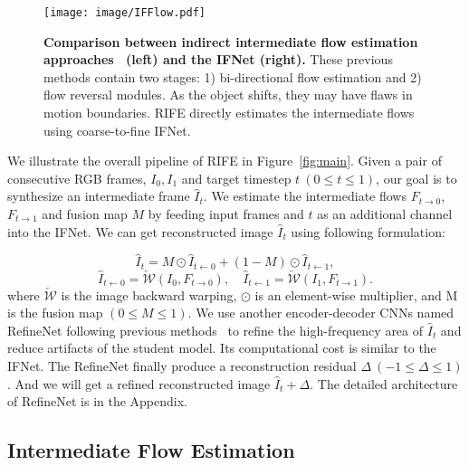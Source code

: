 \documentclass[final]{cvpr}
\newcommand{\backwardwarp}{\overleftarrow{\mathcal{W}}}
\begin{document}
\begin{figure}[t]
	\centering
	\texttt{[image: image/IFFlow.pdf]}
	\caption{\textbf{Comparison between indirect intermediate flow estimation approaches~\cite{jiang2018super, xu2019quadratic, bao2019depth, liu2020enhanced} (left) and the IFNet (right).} These previous methods contain two stages: 1) bi-directional flow estimation and 2) flow reversal modules. As the object shifts, they may have flaws in motion boundaries. RIFE directly estimates the intermediate flows using coarse-to-fine IFNet. }\label{fig:IFFlow}
\end{figure}

We illustrate the overall pipeline of RIFE in Figure~\ref{fig:main}. Given a pair of consecutive RGB frames, $I_0, I_1$ and target timestep $t~(0 \leq t \leq 1)$, our goal is to synthesize an intermediate frame $\widehat{I}_t$. We estimate the intermediate flows $F_{t\rightarrow 0}$, $F_{t\rightarrow 1}$ and fusion map $M$ by feeding input frames and $t$ as an additional channel into the IFNet. We can get reconstructed image $\widehat{I}_t$ using following formulation:

\begin{equation}
\widehat{I}_t = M \odot \widehat{I}_{t\leftarrow 0} + (1 - M) \odot \widehat{I}_{t\leftarrow 1},
\end{equation}
\begin{equation}
\widehat{I}_{t\leftarrow 0} = \backwardwarp(I_0, F_{t\rightarrow 0}),\quad \widehat{I}_{t\leftarrow 1} = \backwardwarp(I_1, F_{t\rightarrow 1}).
\end{equation}
where $\backwardwarp$ is the image backward warping, $\odot$ is an element-wise multiplier, and M is the fusion map $(0 \leq M \leq 1)$. We use another encoder-decoder CNNs named RefineNet following previous methods~\cite{jiang2018super, niklaus2020softmax} to refine the high-frequency area of $\widehat{I}_t$ and reduce artifacts of the student model. Its computational cost is similar to the IFNet. The RefineNet finally produce a reconstruction residual $\Delta~(-1\leq \Delta \leq 1)$. And we will get a refined reconstructed image $\widehat{I}_t + \Delta$. The detailed architecture of RefineNet is in the Appendix.

\subsection{Intermediate Flow Estimation}
\label{subsec:architecture}
\end{document}
